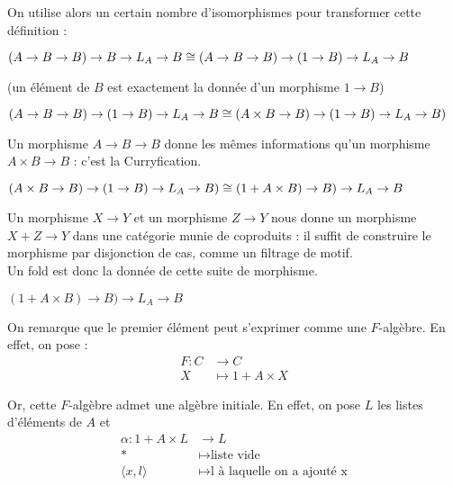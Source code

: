 \documentclass{article}
\begin{document}
On utilise alors un certain nombre d'isomorphismes pour transformer cette définition : 
\begin{center}
 
$(A \rightarrow B \rightarrow B) \rightarrow B \rightarrow L_A \rightarrow B \cong \\ 
(A \rightarrow B \rightarrow B)  \rightarrow (1 \rightarrow B)   \rightarrow L_A \rightarrow B
$
    
\end{center}
(un élément de $B$ est exactement la donnée d'un morphisme $1 \rightarrow B$)
\begin{center}
    
$ (A \rightarrow B \rightarrow B)  \rightarrow (1 \rightarrow B)   \rightarrow L_A \rightarrow B \cong \\ 
(A \times B \rightarrow B) \rightarrow (1 \rightarrow B) \rightarrow L_A \rightarrow B)
$
\end{center}

Un morphisme $A \rightarrow B \rightarrow B$ donne les mêmes informations qu'un morphisme $ A \times B \rightarrow B$ : c'est la Curryfication. 

\begin{center}
    $(A \times B \rightarrow B) \rightarrow (1 \rightarrow B) \rightarrow L_A \rightarrow B) \cong \\ 
    (1 + A \times B ) \rightarrow B) \rightarrow L_A \rightarrow B  $
\end{center}
Un morphisme $X \rightarrow Y$ et un morphisme $ Z \rightarrow Y$ nous donne un morphisme $X + Z \rightarrow Y$ dans une catégorie munie de coproduits : il suffit de construire le morphisme par disjonction de cas, comme un filtrage de motif. \\ 

Un fold est donc la donnée de cette suite de morphisme. 
\begin{center}
    $ (1 + A \times B ) \rightarrow B) \rightarrow L_A \rightarrow B$ 
\end{center}

On remarque que le premier élément peut s'exprimer comme une $F$-algèbre. En effet, on pose :  
\begin{align*}
    F : C & \rightarrow C \\
        X & \mapsto 1 + A \times X 
\end{align*}

Or, cette $F$-algèbre admet une algèbre initiale. En effet, on pose $L$ les listes d'éléments de $A$ et 
\begin{align*}
    \alpha : 1 + A \times L & \rightarrow L \\ 
    * & \mapsto \text{liste vide} \\
    \langle x, l \rangle & \mapsto \text{l à laquelle on a ajouté x}
\end{align*}
\end{document}
